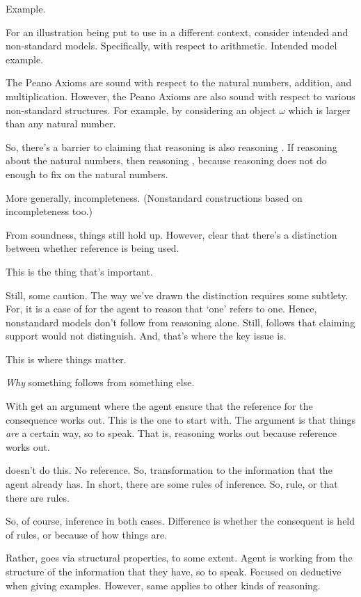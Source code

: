 \begin{note}
  Example.

  For an illustration being put to use in a different context, consider intended and non-standard models.
  Specifically, with respect to arithmetic.
  Intended model example.

  The Peano Axioms are sound with respect to the natural numbers, addition, and multiplication.
  However, the Peano Axioms are also sound with respect to various non-standard structures.
  For example, by considering an object \(\omega\) which is larger than any natural number.

  So, there's a barrier to claiming that reasoning \nr{} is also reasoning \ur{}.
  If reasoning about the natural numbers, then reasoning \ur{}, because reasoning \nr{} does not do enough to fix on the natural numbers.

  More generally, incompleteness.
  (Nonstandard constructions based on incompleteness too.)

  From soundness, things still hold up.
  However, clear that there's a distinction between whether reference is being used.

  This is the thing that's important.

  Still, some caution.
  The way we've drawn the distinction requires some subtlety.
  For, it is a case of \nr{} for the agent to reason that `one' refers to one.
  Hence, nonstandard models don't follow from \nr{} reasoning alone.
  Still, follows that claiming support would not distinguish.
  And, that's where the key issue is.
\end{note}

\begin{note}
  This is where things matter.

  \emph{Why} something follows from something else.

  With \ur{} get an argument where the agent ensure that the reference for the consequence works out.
  This is the one to start with.
  The argument is that things \emph{are} a certain way, so to speak.
  That is, reasoning works out because reference works out.


  \nr{} doesn't do this.
  No reference.
  So, transformation to the information that the agent already has.
  In short, there are some rules of inference.
  So, rule, or that there are rules.

  So, of course, inference in both cases.
  Difference is whether the consequent is held of rules, or because of how things are.

  Rather, goes via structural properties, to some extent.
  Agent is working from the structure of the information that they have, so to speak.
  Focused on deductive when giving examples.
  However, same applies to other kinds of reasoning.
\end{note}


